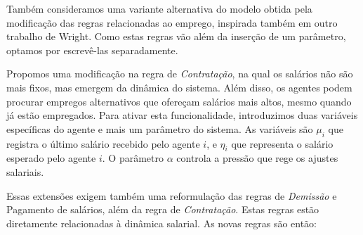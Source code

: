Também consideramos uma variante alternativa do modelo obtida pela modificação das regras relacionadas ao emprego, inspirada também em outro trabalho de Wright\cite{WRIGHT2010}. Como estas regras vão além da inserção de um parâmetro, optamos por escrevê-las separadamente.

Propomos uma modificação na regra de  \textit{Contratação}, na qual os salários não são mais fixos, mas emergem da dinâmica do sistema. Além disso, os agentes podem procurar empregos alternativos que ofereçam salários mais altos, mesmo quando já estão empregados.
%
Para ativar esta funcionalidade, introduzimos duas variáveis específicas do agente e mais um parâmetro do sistema. As variáveis são $\mu_i$ que registra o último salário recebido pelo agente $i$, e $\eta_i$ que representa o salário esperado pelo agente $i$. O parâmetro $\alpha$ controla a pressão que rege os ajustes salariais.

Essas extensões exigem também uma reformulação das regras de  \textit{Demissão} e Pagamento de salários, além da regra de \textit{Contratação}. Estas regras estão diretamente relacionadas à dinâmica salarial. As novas regras são então:

